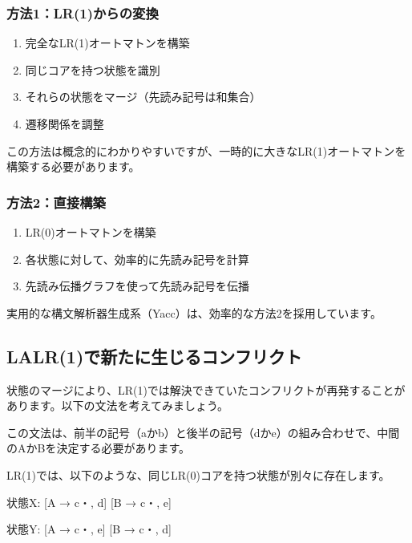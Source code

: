 \subsubsection{方法1：LR(1)からの変換}

\begin{enumerate}
\item
  完全なLR(1)オートマトンを構築
\item
  同じコアを持つ状態を識別
\item
  それらの状態をマージ（先読み記号は和集合）
\item
  遷移関係を調整
\end{enumerate}

この方法は概念的にわかりやすいですが、一時的に大きなLR(1)オートマトンを構築する必要があります。

\subsubsection{方法2：直接構築}

\begin{enumerate}
\item
  LR(0)オートマトンを構築
\item
  各状態に対して、効率的に先読み記号を計算
\item
  先読み伝播グラフを使って先読み記号を伝播
\end{enumerate}

実用的な構文解析器生成系（Yacc）は、効率的な方法2を採用しています。

\subsection{LALR(1)で新たに生じるコンフリクト}

状態のマージにより、LR(1)では解決できていたコンフリクトが再発することがあります。以下の文法を考えてみましょう。


この文法は、前半の記号（aかb）と後半の記号（dかe）の組み合わせで、中間のAかBを決定する必要があります。

LR(1)では、以下のような、同じLR(0)コアを持つ状態が別々に存在します。

\begin{codescreen}{}
状態X: {
    [A → c・, d]
    [B → c・, e]
}

状態Y: {
    [A → c・, e]
    [B → c・, d]
}
\end{codescreen}

